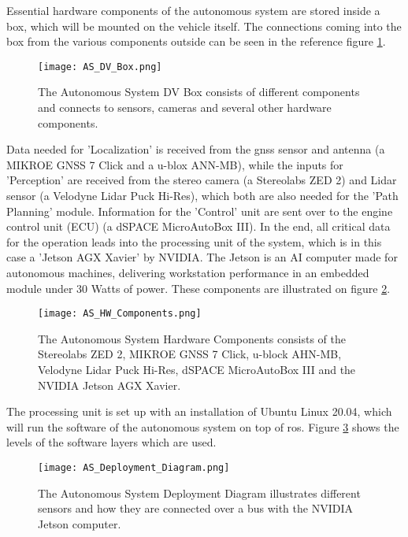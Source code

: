 Essential hardware components of the autonomous system are stored inside a box, which will be mounted on the vehicle itself. The connections coming into the box from the various components outside can be seen in the reference figure \ref{fig:AS DV Box}.

\begin{figure}[H]
    \centering
    \texttt{[image: AS\_DV\_Box.png]}
    \caption{The Autonomous System DV Box consists of different components and connects to sensors, cameras and several other hardware components.}
    \label{fig:AS DV Box}
\end{figure}

Data needed for 'Localization' is received from the \acrshort{gnss} sensor and antenna (a MIKROE GNSS 7 Click and a u-blox ANN-MB), while the inputs for 'Perception' are received from the stereo camera (a Stereolabs ZED 2) and Lidar sensor (a Velodyne Lidar Puck Hi-Res), which both are also needed for the 'Path Planning' module. Information for the 'Control' unit are sent over to the engine control unit (ECU) (a dSPACE MicroAutoBox III). In the end, all critical data for the operation leads into the processing unit of the system, which is in this case a 'Jetson AGX Xavier' by NVIDIA. The Jetson is an AI computer made for autonomous machines, delivering workstation performance in an embedded module under 30 Watts of power. These components are illustrated on figure \ref{fig:AS HW Components}.
\begin{figure}[H]
    \centering
    \texttt{[image: AS\_HW\_Components.png]}
    \caption{The Autonomous System Hardware Components consists of the Stereolabs ZED 2, MIKROE GNSS 7 Click, u-block AHN-MB, Velodyne Lidar Puck Hi-Res, dSPACE MicroAutoBox III and the NVIDIA Jetson AGX Xavier.}
    \label{fig:AS HW Components}
\end{figure}

The processing unit is set up with an installation of Ubuntu Linux 20.04, which will run the software of the autonomous system on top of \acrshort{ros}. Figure \ref{fig:AS Deployment Diagram} shows the levels of the software layers which are used.
\begin{figure}[H]
    \centering
    \texttt{[image: AS\_Deployment\_Diagram.png]}
    \caption{The Autonomous System Deployment Diagram illustrates different sensors and how they are connected over a bus with the NVIDIA Jetson computer.}
    \label{fig:AS Deployment Diagram}
\end{figure}


